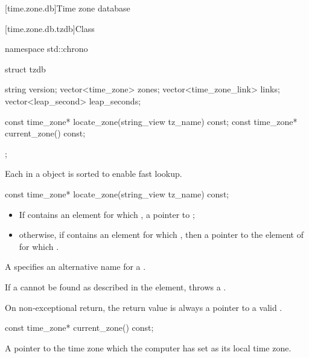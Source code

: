 [time.zone.db]{Time zone database}

[time.zone.db.tzdb]{Class }

\begin{codeblock}
namespace std::chrono {
  struct tzdb {
    string                 version;
    vector<time_zone>      zones;
    vector<time_zone_link> links;
    vector<leap_second>    leap_seconds;

    const time_zone* locate_zone(string_view tz_name) const;
    const time_zone* current_zone() const;
  };
}
\end{codeblock}

\pnum
Each  in a  object
is sorted to enable fast lookup.

%
\begin{itemdecl}
const time_zone* locate_zone(string_view tz_name) const;
\end{itemdecl}

\begin{itemdescr}
\pnum
\returns
\begin{itemize}
\item
If  contains an element 
for which ,
a pointer to ;
\item
otherwise,
if  contains an element 
for which ,
then a pointer to the element  of 
for which .
\end{itemize}
\begin{note}
A  specifies an alternative name for a .
\end{note}

\pnum
\throws
If a  cannot be found
as described in the \returns element,
throws a .
\begin{note}
On non-exceptional return, the return value is always a pointer to a valid .
\end{note}
\end{itemdescr}

%
\begin{itemdecl}
const time_zone* current_zone() const;
\end{itemdecl}

\begin{itemdescr}
\pnum
\returns
A pointer to the time zone which the computer has set as its local time zone.
\end{itemdescr}

